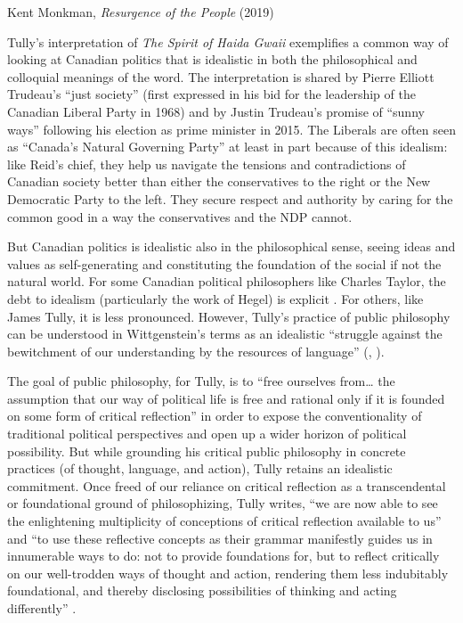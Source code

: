 \documentclass[12pt,oneside]{memoir}
\begin{document}
\bigskip
\begin{flushleft}
Kent Monkman, \emph{Resurgence of the People} (2019)
\end{flushleft}

\bigskip

Tully’s interpretation of \emph{The Spirit of Haida Gwaii} exemplifies a common way of looking at Canadian politics that is idealistic in both the philosophical and colloquial meanings of the word. The interpretation is shared by Pierre Elliott Trudeau’s “just society” (first expressed in his bid for the leadership of the Canadian Liberal Party in 1968) and by Justin Trudeau’s promise of “sunny ways” following his election as prime minister in 2015. The Liberals are often seen as “Canada’s Natural Governing Party” at least in part because of this idealism: like Reid’s chief, they help us navigate the tensions and contradictions of Canadian society better than either the conservatives to the right or the New Democratic Party to the left. They secure respect and authority by caring for the common good in a way the conservatives and the NDP cannot.

But Canadian politics is idealistic also in the philosophical sense, seeing ideas and values as self-generating and constituting the foundation of the social if not the natural world. For some Canadian political philosophers like Charles Taylor, the debt to idealism (particularly the work of Hegel) is explicit \citep{Sibley2008, Meynell2011}. For others, like James Tully, it is less pronounced. However, Tully’s practice of public philosophy can be understood in Wittgenstein’s terms as an idealistic “struggle against the bewitchment of our understanding by the resources of language” (\cite[52]{Wittgenstein2009}, \cite[70]{Tully2008}).

The goal of public philosophy, for Tully, is to “free ourselves from… the assumption that our way of political life is free and rational only if it is founded on some form of critical reflection” \citep[39]{Tully2008} in order to expose the conventionality of traditional political perspectives and open up a wider horizon of political possibility. But while grounding his critical public philosophy in concrete practices (of thought, language, and action), Tully retains an idealistic commitment. Once freed of our reliance on critical reflection as a transcendental or foundational ground of philosophizing, Tully writes, “we are now able to see the enlightening multiplicity of conceptions of critical reflection available to us” and “to use these reflective concepts as their grammar manifestly guides us in innumerable ways to do: not to provide foundations for, but to reflect critically on our well-trodden ways of thought and action, rendering them less indubitably foundational, and thereby disclosing possibilities of thinking and acting differently” \citep[70]{Tully2008}.
\end{document}

